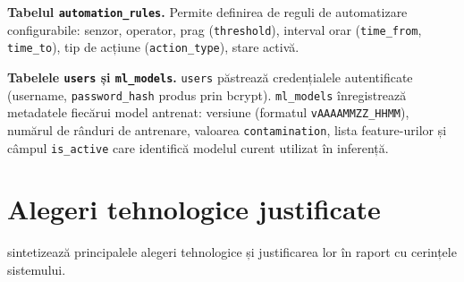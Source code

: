 \textbf{Tabelul \texttt{automation\_rules}.}
Permite definirea de reguli de automatizare configurabile: senzor, operator,
prag (\texttt{threshold}), interval orar (\texttt{time\_from}, \texttt{time\_to}),
tip de acțiune (\texttt{action\_type}), stare activă.

\textbf{Tabelele \texttt{users} și \texttt{ml\_models}.}
\texttt{users} păstrează credențialele autentificate (username, \texttt{password\_hash}
produs prin bcrypt). \texttt{ml\_models} înregistrează metadatele fiecărui model antrenat:
versiune (formatul \texttt{vAAAAMMZZ\_HHMM}), numărul de rânduri de antrenare,
valoarea \texttt{contamination}, lista feature-urilor și câmpul \texttt{is\_active}
care identifică modelul curent utilizat în inferență.

\section{Alegeri tehnologice justificate}
\label{sec:tehnologii}

 sintetizează principalele alegeri tehnologice și justificarea
lor în raport cu cerințele sistemului.

